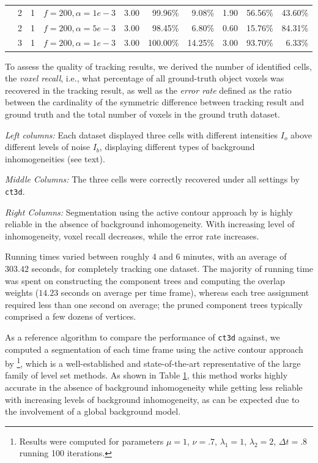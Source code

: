 \begin{table}
\begin{threeparttable}
\begin{tabular}{|c|ccc|rrr|rrr|}
& 2    & 1     & $f=200,\alpha=1e-3$& 3.00  & 99.96\%    &        9.08\%         &1.90	& 56.56\%	& 43.60\%\\	
& 2    & 1     & $f=200,\alpha=5e-3$& 3.00  & 98.45\%    &        6.80\%         &0.60	& 15.76\%	& 84.31\%\\	
& 3    & 1     & $f=200,\alpha=1e-3$& 3.00  &100.00\%    &       14.25\%         &3.00	& 93.70\%	& 6.33\%\\	
\hline
  \end{tabular}
\begin{tablenotes}
\footnotesize
\item To assess the quality
    of tracking results, we derived the number of identified cells, the
    \emph{voxel recall}, i.e., what percentage of all ground-truth
    object voxels was recovered in the tracking result, as well as the
    \emph{error rate} defined as the ratio between the cardinality of 
    the symmetric difference between tracking result and ground truth 
    and the total number of voxels in the ground truth dataset. 
\item \emph{Left columns:} Each
    dataset displayed three cells with different intensities $I_o$ above
    different levels of noise $I_b$, displaying different types of
    background inhomogeneities (see text). 
\item \emph{Middle Columns:} The
    three cells were correctly recovered under all settings by
    \texttt{ct3d}. 
\item \emph{Right Columns:} Segmentation using the active 
    contour approach by \cite{chan2001active} is highly reliable in the absence of 
    background inhomogeneity.
    With increasing level of inhomogeneity, voxel 
    recall decreases, while the error rate increases.
\end{tablenotes}
  \end{threeparttable}
  \label{tab:coseg-tab1}
\end{table}

Running times varied between roughly 4 and 6 minutes, with an average
of $303.42$ seconds, for completely tracking one dataset. The majority
of running time was spent on constructing the component trees and
computing the overlap weights ($14.23$ seconds on average per time
frame), whereas each tree assignment required less than one second on
average; the pruned component trees typically comprised a few dozens
of vertices.

As a reference algorithm to compare the performance of \texttt{ct3d}
against, we computed a segmentation of each time frame using the
active contour approach by \cite{chan2001active}\footnote{Results were
  computed for parameters $\mu=1$, $\nu=.7$, $\lambda_1=1$,
  $\lambda_2=2$, $\Delta t=.8$ running 100 iterations.}, which is a
well-established and state-of-the-art representative of the large
family of level set methods. As shown in Table
\ref{tab:coseg-tab1}, this method works highly accurate in the
absence of background inhomogeneity while getting less reliable with
increasing levels of background inhomogeneity, as can be expected due
to the involvement of a global background model.

